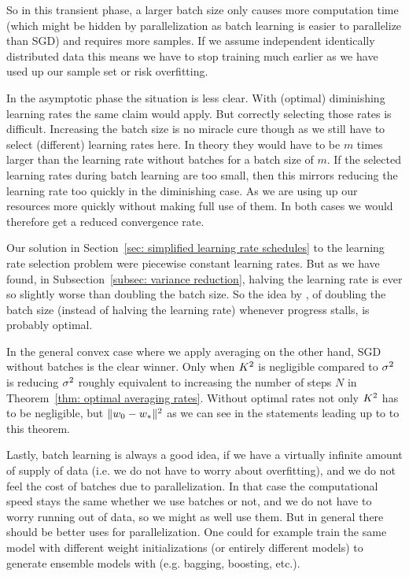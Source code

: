 So in this transient phase, a larger batch size only causes more computation
time (which might be hidden by parallelization as batch learning is easier to
parallelize than SGD) and requires more samples. If we assume independent
identically distributed data this means we have to stop training much earlier as
we have used up our sample set or risk overfitting.

In the asymptotic phase the situation is less clear. With (optimal) diminishing
learning rates the same claim would apply. But correctly selecting those rates
is difficult. Increasing the batch size is no miracle cure though as we still
have to select (different) learning rates here. In theory they would have to
be \(m\) times larger than the learning rate without batches for a batch
size of \(m\). If the selected learning rates during batch learning are too
small, then this mirrors reducing the learning rate too quickly in the diminishing
case. As we are using up our resources more quickly without making full use of
them. In both cases we would therefore get a reduced convergence rate.

Our solution in Section~\ref{sec: simplified learning rate schedules} to the
learning rate selection problem were piecewise constant learning rates. But
as we have found, in Subsection~\ref{subsec: variance reduction}, halving the
learning rate is ever so slightly worse than doubling the batch size. So the
idea by \textcite{smithDonDecayLearning2018}, of doubling the batch size
(instead of halving the learning rate) whenever progress stalls, is probably
optimal.

In the general convex case where we apply averaging on the other hand, SGD
without batches is the clear winner. Only when \(K^2\) is negligible
compared to \(\sigma^2\) is reducing \(\sigma^2\) roughly equivalent to
increasing the number of steps \(N\) in Theorem~\ref{thm: optimal averaging rates}.
Without optimal rates not only \(K^2\) has to be negligible, but
\(\|w_0 -w_*\|^2\) as we can see in the statements leading up to
to this theorem.

Lastly, batch learning is always a good idea, if we have a virtually infinite
amount of supply of data (i.e. we do not have to worry about overfitting), and
we do not feel the cost of batches due to parallelization. In that case the
computational speed stays the same whether we use batches or not, and we do not
have to worry running out of data, so we might as well use them. But in general
there should be better uses for parallelization. One could for example train
the same model with different weight initializations (or entirely different
models) to generate ensemble models with (e.g. bagging, boosting, etc.).

